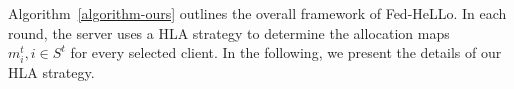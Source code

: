 \documentclass[lettersize,journal]{IEEEtran}
\begin{document}
Algorithm~\ref{algorithm-ours} outlines the overall framework of Fed-HeLLo. 
In each round, the server uses a HLA strategy to determine the allocation maps $m_i^t, i\in S^t$ for every selected client. In the following, we present the details of our HLA strategy. 

\end{document}
